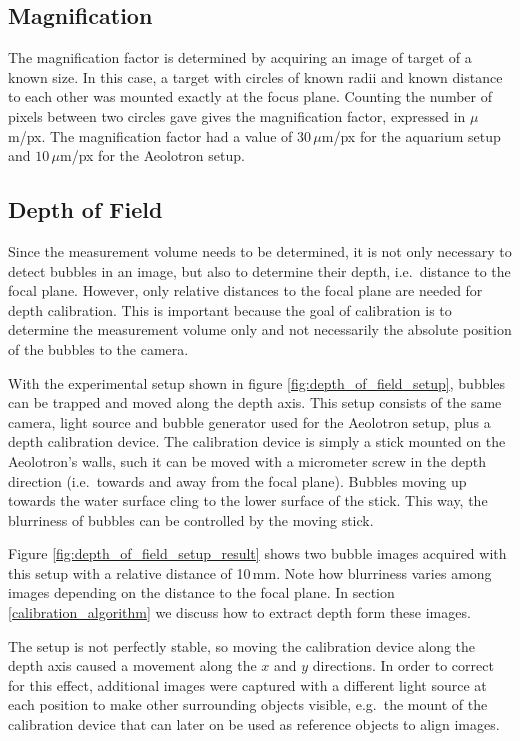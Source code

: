 		\subsection{Magnification}\label{sub:magnification}
			The magnification factor is determined by acquiring an image of target of a known size. In this case, a target with circles of known radii and known distance to each other was mounted exactly at the focus plane. Counting the number of pixels between two circles gave gives the magnification factor, expressed in $\mu$m/px. The magnification factor had a value of $30\, \mu$m/px for the aquarium setup and $10 \, \mu$m/px for the Aeolotron setup. 
		\subsection{Depth of Field}\label{sub:depth_of_field_setup}
			Since the measurement volume needs to be determined, it is not only necessary to detect bubbles in an image, but also to determine their depth, i.e.\ distance to the focal plane. However, only relative distances to the focal plane are needed for depth calibration. This is important because the goal of calibration is to determine the measurement volume only and not necessarily the absolute position of the bubbles to the camera. 
			
			With the experimental setup shown in figure \ref{fig:depth_of_field_setup}, bubbles can be trapped and moved along the depth axis. This setup consists of the same camera, light source and bubble generator used for the Aeolotron setup, plus a depth calibration device. The calibration device is simply a stick mounted on the Aeolotron's walls, such it can be moved with a micrometer screw in the depth direction (i.e.\ towards and away from the focal plane). Bubbles moving up towards the water surface cling to the lower surface of the stick. This way, the blurriness of bubbles can be controlled by the moving stick.  
			
			Figure \ref{fig:depth_of_field_setup_result} shows two bubble images acquired with this setup with a relative distance of 10\,mm. Note how blurriness varies among images depending on the distance to the focal plane. In section \ref{calibration_algorithm} we discuss how to extract depth form these images. 
			
			The setup is not perfectly stable, so moving the calibration device along the depth axis caused a movement along the $x$ and $y$ directions. In order to correct for this effect, additional images were captured with a different light source at each position to make other surrounding objects visible, e.g.\ the mount of the calibration device that can later on be used as reference objects to align images.  
			
